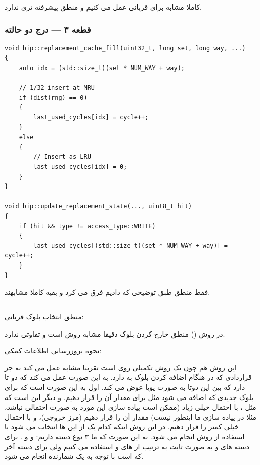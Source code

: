 \documentclass[12pt,a4paper]{article}
\begin{document}
کاملا مشابه  برای قربانی عمل می کنیم و منطق پیشرفته تری ندارد.

\subsubsection{قطعه ۳ — درج دو حالته}

\begin{latin}
\begin{lstlisting}
void bip::replacement_cache_fill(uint32_t, long set, long way, ...)
{
    auto idx = (std::size_t)(set * NUM_WAY + way);

    // 1/32 insert at MRU
    if (dist(rng) == 0)
    {
        last_used_cycles[idx] = cycle++;
    }
    else
    {
        // Insert as LRU
        last_used_cycles[idx] = 0;
    }
}

void bip::update_replacement_state(..., uint8_t hit)
{
    if (hit && type != access_type::WRITE)
    {
        last_used_cycles[(std::size_t)(set * NUM_WAY + way)] = cycle++;
    }
}
\end{lstlisting}
\end{latin}

فقط منطق  طبق توضیحی که دادیم فرق می کرد و بقیه کاملا مشابهند.

\subsection{}

منطق انتخاب بلوک قربانی:

در روش  () منطق خارج کردن بلوک دقیقا مشابه روش  است و تفاوتی ندارد.

نحوه بروزرسانی اطلاعات کمکی:

این روش هم چون یک روش تکمیلی روی  است تقریبا مشابه عمل می کند به جز قراردادی که در هنگام اضافه کردن بلوک به  دارد. به این صورت عمل می کند که دو تا  دارد که بین این دوتا به صورت پویا عوض می کند.  اول به این صورت است که برای بلوک جدیدی که اضافه می شود مثل  برای مقدار  آن  را قرار دهیم. و  دیگر این است که مثل ، با احتمال خیلی زیاد (ممکن است پیاده سازی این مورد به صورت احتمالی نباشد، مثلا در پیاده سازی ما اینطور نیست) مقدار  آن را  قرار دهیم (مرز خروجی)، و با احتمال خیلی کمتر  را قرار دهیم. در این روش اینکه کدام یک از این  ها انتخاب می شود با استفاده از روش  انجام می شود. به این صورت که ما ۳ نوع دسته داریم:  و  و . برای دسته های  و  به صورت ثابت به ترتیب از  های  و  استفاده می کنیم ولی برای دسته آخر که  است با توجه به یک شمارنده  انجام می شود.
\end{document}
